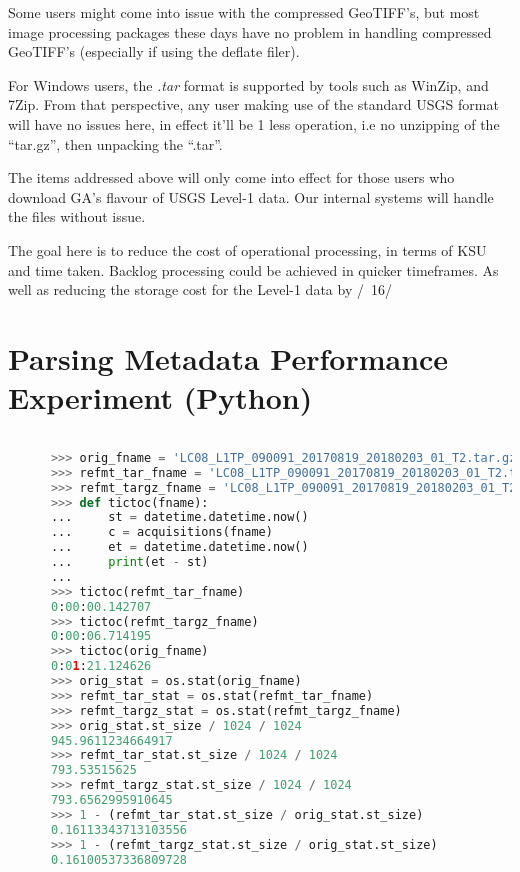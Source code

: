 \documentclass[a4paper]{article}
\begin{document}
\begin{flushleft}
    Some users might come into issue with the compressed GeoTIFF’s, but most image processing packages these days have no problem in handling compressed GeoTIFF’s (especially if using the deflate filer). \par
    For Windows users, the \textit{.tar} format is supported by tools such as WinZip, and 7Zip. From that perspective, any user making use of the standard USGS format will have no issues here, in effect it’ll be 1 less operation, i.e no unzipping of the “tar.gz”, then unpacking the “.tar”. \par
    The items addressed above will only come into effect for those users who download GA’s flavour of USGS Level-1 data. Our internal systems will handle the files without issue. \par
    The goal here is to reduce the cost of operational processing, in terms of KSU and time taken. Backlog processing could be achieved in quicker timeframes. As well as reducing the storage cost for the Level-1 data by /~16/%
    \end{flushleft}
    
  \appendix
  \section{Parsing Metadata Performance Experiment (Python)}

    \begin{lstlisting}[language=Python]
    
      >>> orig_fname = 'LC08_L1TP_090091_20170819_20180203_01_T2.tar.gz'
      >>> refmt_tar_fname = 'LC08_L1TP_090091_20170819_20180203_01_T2.tar'
      >>> refmt_targz_fname = 'LC08_L1TP_090091_20170819_20180203_01_T2.tar.gz'
      >>> def tictoc(fname):
      ...     st = datetime.datetime.now()
      ...     c = acquisitions(fname)
      ...     et = datetime.datetime.now()
      ...     print(et - st)
      ...  
      >>> tictoc(refmt_tar_fname)
      0:00:00.142707
      >>> tictoc(refmt_targz_fname)
      0:00:06.714195
      >>> tictoc(orig_fname)
      0:01:21.124626
      >>> orig_stat = os.stat(orig_fname)
      >>> refmt_tar_stat = os.stat(refmt_tar_fname)
      >>> refmt_targz_stat = os.stat(refmt_targz_fname)
      >>> orig_stat.st_size / 1024 / 1024
      945.9611234664917
      >>> refmt_tar_stat.st_size / 1024 / 1024          
      793.53515625
      >>> refmt_targz_stat.st_size / 1024 / 1024
      793.6562995910645
      >>> 1 - (refmt_tar_stat.st_size / orig_stat.st_size)
      0.16113343713103556
      >>> 1 - (refmt_targz_stat.st_size / orig_stat.st_size)
      0.16100537336809728
    \end{lstlisting}
\end{document}

